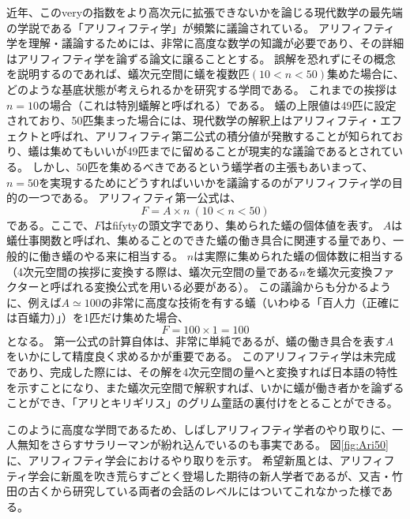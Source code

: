 近年、このveryの指数をより高次元に拡張できないかを論じる現代数学の最先端の学説である「アリフィフティ学」が頻繁に議論されている。
アリフィフティ学を理解・議論するためには、非常に高度な数学の知識が必要であり、その詳細はアリフィフティ学を論ずる論文に譲ることとする。
誤解を恐れずにその概念を説明するのであれば、蟻次元空間に蟻を複数匹$(10<n<50)$集めた場合に、どのような基底状態が考えられるかを研究する学問である。
これまでの挨拶は$n=10$の場合（これは特別蟻解と呼ばれる）である。
蟻の上限値は49匹に設定されており、50匹集まった場合には、現代数学の解釈上はアリフィフティ・エフェクトと呼ばれ、アリフィフティ第二公式の積分値が発散することが知られており、蟻は集めてもいいが49匹までに留めることが現実的な議論であるとされている。
しかし、50匹を集めるべきであるという蟻学者の主張もあいまって、$n=50$を実現するためにどうすればいいかを議論するのがアリフィフティ学の目的の一つである。
アリフィフティ第一公式は、
\[
F = A \times n\  (10<n<50)
\]
である。ここで、$F$はfifytyの頭文字であり、集められた蟻の個体値を表す。
$A$は蟻仕事関数と呼ばれ、集めることのできた蟻の働き具合に関連する量であり、一般的に働き蟻のやる来に相当する。
$n$は実際に集められた蟻の個体数に相当する（4次元空間の挨拶に変換する際は、蟻次元空間の量である$n$を蟻次元変換ファクターと呼ばれる変換公式を用いる必要がある）。
この議論からも分かるように、例えば$A \simeq 100 $の非常に高度な技術を有する蟻（いわゆる「百人力（正確には百蟻力）」）を1匹だけ集めた場合、
\[
F = 100 \times 1 = 100
\]
となる。
第一公式の計算自体は、非常に単純であるが、蟻の働き具合を表す$A$をいかにして精度良く求めるかが重要である。
このアリフィフティ学は未完成であり、完成した際には、その解を4次元空間の量へと変換すれば日本語の特性を示すことになり、また蟻次元空間で解釈すれば、いかに蟻が働き者かを論ずることができ、「アリとキリギリス」のグリム童話の裏付けをとることができる。

\par

このように高度な学問であるため、しばしアリフィフティ学者のやり取りに、一人無知をさらすサラリーマンが紛れ込んでいるのも事実である。
図\ref{fig:Ari50}に、アリフィフティ学会におけるやり取りを示す。
希望新風とは、アリフィフティ学会に新風を吹き荒らすごとく登場した期待の新人学者であるが、又吉・竹田の古くから研究している両者の会話のレベルにはついてこれなかった様である。

